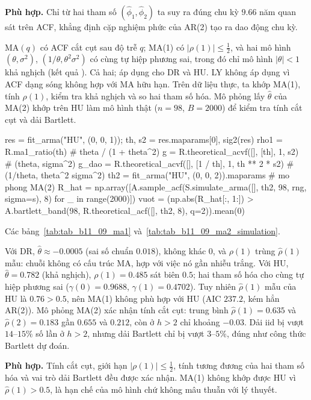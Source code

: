  \textbf{Phù hợp.} Chỉ từ hai tham số $(\hat\phi_1,\hat\phi_2)$ ta suy ra đúng chu kỳ $9.66$ năm quan sát trên ACF, khẳng định cặp nghiệm phức của AR(2) tạo ra dao động chu kỳ.

 MA$(q)$ có ACF cắt cụt sau độ trễ $q$; MA(1) có $|\rho(1)|\le\tfrac12$, và hai mô hình $(\theta,\sigma^2)$, $(1/\theta,\theta^2\sigma^2)$ có cùng tự hiệp phương sai, trong đó chỉ mô hình $|\theta|<1$ khả nghịch (kết quả ).
 Cả hai; áp dụng cho DR và HU. LY không áp dụng vì ACF dạng sóng không hợp với MA hữu hạn. Trên dữ liệu thực, ta khớp MA(1), tính $\rho(1)$, kiểm tra khả nghịch và so hai tham số hóa. Mô phỏng lấy $\hat\theta$ của MA(2) khớp trên HU làm mô hình thật ($n=98$, $B=2000$) để kiểm tra tính cắt cụt và dải Bartlett.
\begin{codeblock}
res = fit_arma("HU", (0, 0, 1)); th, s2 = res.maparams[0], sig2(res)
rho1 = R.ma1_ratio(th)                                   # theta / (1 + theta^2)
g = R.theoretical_acvf([], [th], 1, s2)                   # (theta, sigma^2)
g_dao = R.theoretical_acvf([], [1 / th], 1, th ** 2 * s2) # (1/theta, theta^2 sigma^2)
th2 = fit_arma("HU", (0, 0, 2)).maparams                  # mo phong MA(2)
R_hat = np.array([A.sample_acf(S.simulate_arma([], th2, 98, rng, sigma=s), 8) for _ in range(2000)])
vuot = (np.abs(R_hat[:, 1:]) > A.bartlett_band(98, R.theoretical_acf([], th2, 8), q=2)).mean(0)
\end{codeblock}
 Các bảng~\ref{tab:tab_b11_09_ma1} và~\ref{tab:tab_b11_09_ma2_simulation}.


 Với DR, $\hat\theta\approx-0.0005$ (sai số chuẩn $0.018$), không khác $0$, và $\rho(1)$ trùng $\hat\rho(1)$ mẫu: chuỗi không có cấu trúc MA, hợp với việc nó gần nhiễu trắng. Với HU, $\hat\theta=0.782$ (khả nghịch), $\rho(1)=0.485$ sát biên $0.5$; hai tham số hóa cho cùng tự hiệp phương sai ($\gamma(0)=0.9688$, $\gamma(1)=0.4702$). Tuy nhiên $\hat\rho(1)$ mẫu của HU là $0.76>0.5$, nên MA(1) không phù hợp với HU (AIC $237.2$, kém hẳn AR(2)). Mô phỏng MA(2) xác nhận tính cắt cụt: trung bình $\hat\rho(1)=0.635$ và $\hat\rho(2)=0.183$ gần $0.655$ và $0.212$, còn ở $h>2$ chỉ khoảng $-0.03$. Dải iid bị vượt $14$--$15\%$ số lần ở $h>2$, nhưng dải Bartlett chỉ bị vượt $3$--$5\%$, đúng như công thức Bartlett dự đoán.

 \textbf{Phù hợp.} Tính cắt cụt, giới hạn $|\rho(1)|\le\tfrac12$, tính tương đương của hai tham số hóa và vai trò dải Bartlett đều được xác nhận. MA(1) không khớp được HU vì $\hat\rho(1)>0.5$, là hạn chế của mô hình chứ không mâu thuẫn với lý thuyết.

